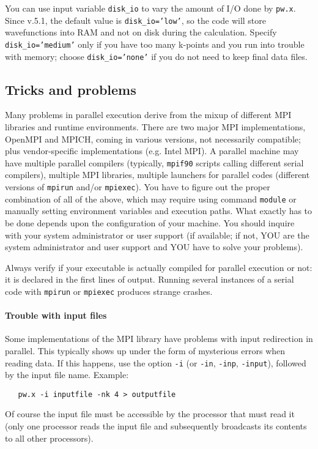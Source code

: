 \documentclass[12pt,a4paper]{article}
\def\pwx{\texttt{pw.x}}
\def\cpx{\texttt{cp.x}}
\begin{document}
You can use input variable \texttt{disk\_io} to vary the
amount of I/O done by \pwx. Since v.5.1, the default value is
\texttt{disk\_io='low'}, so the code will store wavefunctions
into RAM and not on disk during the calculation. Specify
\texttt{disk\_io='medium'} only if you have too many k-points
and you run into trouble with memory; choose \texttt{disk\_io='none'}
if you do not need to keep final data files.


\subsection{Tricks and problems}
\label{SubSec:badpara}

Many problems in parallel execution derive from the mixup of different
MPI libraries and runtime environments. There are two major MPI
implementations, OpenMPI and MPICH, coming in various versions,
not necessarily compatible; plus vendor-specific implementations
(e.g. Intel MPI). A parallel machine may have multiple parallel
compilers (typically, \texttt{mpif90} scripts calling different
serial compilers), multiple MPI libraries, multiple launchers
for parallel codes (different versions of \texttt{mpirun} and/or
\texttt{mpiexec}). You have to figure out the proper combination
of all of the above, which may require using command \texttt{module}
or manually setting environment variables and execution paths.
What exactly has to be done depends upon the configuration of your
machine. You should inquire with your system administrator or user
support (if available; if not, YOU are the system administrator
and user support and YOU have to solve your problems).

Always verify if your executable is actually compiled for
parallel execution or not: it is declared in the first lines
of output. Running several instances of a serial code with
\texttt{mpirun} or \texttt{mpiexec} produces strange crashes.

\paragraph{Trouble with input files}
Some implementations of the MPI library have problems with input
redirection in parallel. This typically shows up under the form of
mysterious errors when reading data. If this happens, use the option
\texttt{-i} (or \texttt{-in}, \texttt{-inp}, \texttt{-input}),
followed by the input file name.
Example:
\begin{verbatim}
   pw.x -i inputfile -nk 4 > outputfile
\end{verbatim}
Of course the
input file must be accessible by the processor that must read it
(only one processor reads the input file and subsequently broadcasts
its contents to all other processors).
\end{document}
